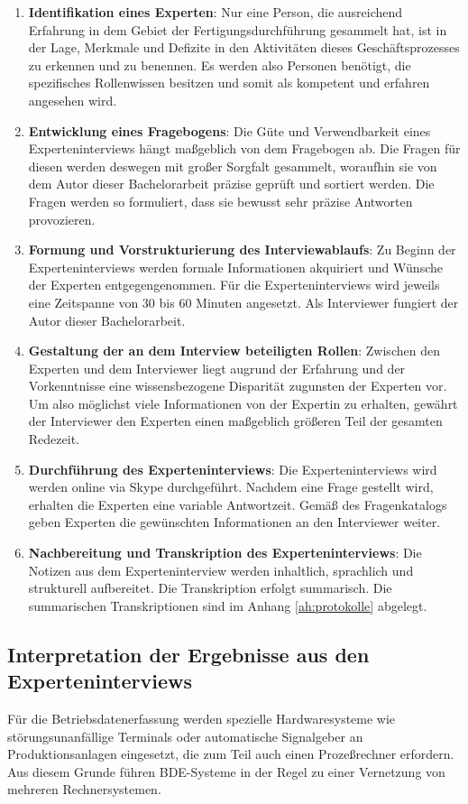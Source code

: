 \begin{enumerate}
    \item 
    \textbf{Identifikation eines Experten}: Nur eine Person, die ausreichend Erfahrung in dem Gebiet der Fertigungsdurchführung gesammelt hat, ist in der Lage, Merkmale und Defizite in den Aktivitäten dieses Geschäftsprozesses zu erkennen und zu benennen. Es werden also Personen benötigt, die spezifisches Rollenwissen besitzen und somit als kompetent und erfahren angesehen wird.
    \item
    \textbf{Entwicklung eines Fragebogens}: Die Güte und Verwendbarkeit eines Experteninterviews hängt maßgeblich von dem Fragebogen ab. Die Fragen für diesen werden deswegen mit großer Sorgfalt gesammelt, woraufhin sie von dem Autor dieser Bachelorarbeit präzise geprüft und sortiert werden. Die Fragen werden so formuliert, dass sie bewusst sehr präzise Antworten provozieren.
    \item
    \textbf{Formung und Vorstrukturierung des Interviewablaufs}: Zu Beginn der Experteninterviews werden formale Informationen akquiriert und Wünsche der Experten entgegengenommen. 
    Für die Experteninterviews wird jeweils eine Zeitspanne von 30 bis 60 Minuten angesetzt. Als Interviewer fungiert der Autor dieser Bachelorarbeit.
    \item
    \textbf{Gestaltung der an dem Interview beteiligten Rollen}: Zwischen den Experten und dem Interviewer liegt augrund der Erfahrung und der Vorkenntnisse eine wissensbezogene Disparität zugunsten der Experten vor. Um also möglichst viele Informationen von der Expertin zu erhalten, gewährt der Interviewer den Experten einen maßgeblich größeren Teil der gesamten Redezeit.
    \item
   \textbf{ Durchführung des Experteninterviews}: Die Experteninterviews wird werden online via Skype durchgeführt. Nachdem eine Frage gestellt wird, erhalten die Experten eine variable Antwortzeit. Gemäß des Fragenkatalogs geben Experten die gewünschten Informationen an den Interviewer weiter.
    \item
    \textbf{Nachbereitung und Transkription des Experteninterviews}: Die Notizen aus dem Experteninterview werden inhaltlich, sprachlich und strukturell aufbereitet. Die Transkription erfolgt summarisch. Die summarischen Transkriptionen sind im Anhang \ref{ah:protokolle} abgelegt.
    
\end{enumerate}

\subsection{Interpretation der Ergebnisse aus den Experteninterviews}
Für die Betriebsdatenerfassung werden spezielle Hardwaresysteme wie störungsunanfällige Terminals oder automatische Signalgeber an Produktionsanlagen eingesetzt, die zum Teil auch einen Prozeßrechner erfordern. Aus diesem Grunde führen BDE-Systeme in der Regel zu einer Vernetzung von mehreren Rechnersystemen.

